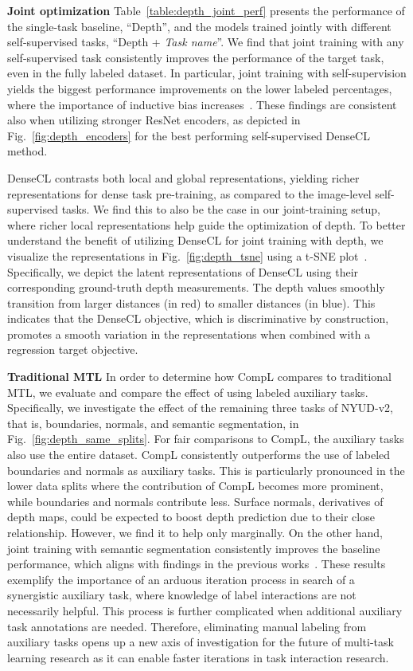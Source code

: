 \documentclass[10pt,twocolumn,letterpaper]{article}
\newcommand{\parsection}[1]{\vspace{1mm}\noindent\textbf{#1 }}
\begin{document}
\parsection{Joint optimization}
Table~\ref{table:depth_joint_perf} presents the performance of the single-task baseline, ``Depth'', and the models trained jointly with different self-supervised tasks, ``Depth + \emph{Task name}''. 
We find that joint training with any self-supervised task consistently improves the performance of the target task, even in the fully labeled dataset. 
In particular, joint training with self-supervision yields the biggest performance improvements on the lower labeled percentages, where the importance of inductive bias increases~\cite{baxter2000model}.
These findings are consistent also when utilizing stronger ResNet encoders, as depicted in Fig.~\ref{fig:depth_encoders} for the best performing self-supervised DenseCL method.

 
DenseCL contrasts both local and global representations, yielding richer representations for dense task pre-training, as compared to the image-level self-supervised tasks.
We find this to also be the case in our joint-training setup, where richer local representations help guide the optimization of depth.
To better understand the benefit of utilizing DenseCL for joint training with depth, we visualize the representations in Fig.~\ref{fig:depth_tsne} using a t-SNE plot~\cite{van2008visualizing}.
Specifically, we depict the latent representations of DenseCL using their corresponding ground-truth depth measurements.
The depth values smoothly transition from larger distances (in red) to smaller distances (in blue). 
This indicates that the DenseCL objective, which is discriminative by construction, promotes a smooth variation in the representations when combined with a regression target objective.

\parsection{Traditional MTL}
In order to determine how CompL compares to traditional MTL, we evaluate and compare the effect of using labeled auxiliary tasks.
Specifically, we investigate the effect of the remaining three tasks of NYUD-v2, that is, boundaries, normals, and semantic segmentation, in Fig.~\ref{fig:depth_same_splits}. 
For fair comparisons to CompL, the auxiliary tasks also use the entire dataset. 
CompL consistently outperforms the use of labeled boundaries and normals as auxiliary tasks.
This is particularly pronounced in the lower data splits where the contribution of CompL becomes more prominent, while boundaries and normals contribute less.
Surface normals, derivatives of depth maps, could be expected to boost depth prediction due to their close relationship.
However, we find it to help only marginally.
On the other hand, joint training with semantic segmentation consistently improves the baseline performance, which aligns with findings in the previous works~\cite{chen2019towards,guizilini2020semantically,jiao2018look}. 
These results exemplify the importance of an arduous iteration process in search of a synergistic auxiliary task, where knowledge of label interactions are not necessarily helpful.
This process is further complicated when additional auxiliary task annotations are needed.
Therefore, eliminating manual labeling from auxiliary tasks opens up a new axis of investigation for the future of multi-task learning research as it can enable faster iterations in task interaction research.
\end{document}
